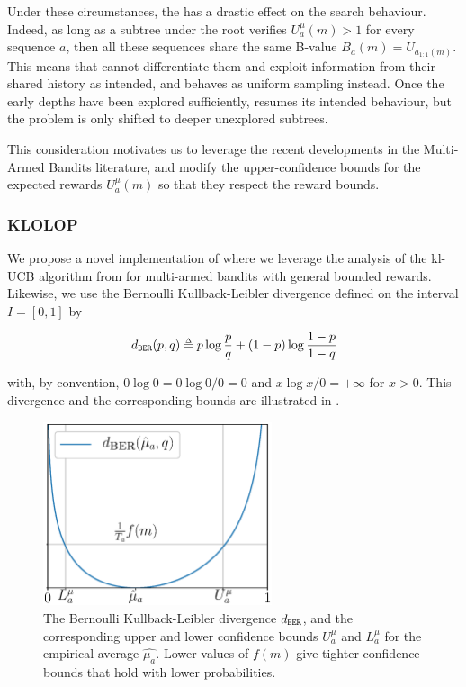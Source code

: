 Under these circumstances, the  has a drastic effect on the search behaviour. Indeed, as long as a subtree under the root verifies $U^{\mu}_a(m) > 1$ for every sequence $a$, then all these sequences share the same B-value $B_a(m) = U_{a_{1:1}(m)}$. This means that \OLOP cannot differentiate them and exploit information from their shared history as intended, and behaves as uniform sampling instead.
Once the early depths have been explored sufficiently, \OLOP resumes its intended behaviour, but the problem is only shifted to deeper unexplored subtrees.

This consideration motivates us to leverage the recent developments in the Multi-Armed Bandits literature, and modify the upper-confidence bounds for the expected rewards $U^\mu_a(m)$ so that they respect the reward bounds.


\subsubsection{\gls*{KLOLOP}}
\label{sec:kl-olop-kl-olop}

\noindent
We propose a novel implementation of  where we leverage the analysis of the kl-UCB algorithm from \citep{Cappe2013} for multi-armed bandits with general bounded rewards.
Likewise, we use the Bernoulli Kullback-Leibler divergence defined on the interval $I=[0,1]$ by

\begin{equation*}
\dber(p, q) \eqdef p \log \frac{p}{q} + (1-p)\log\frac{1-p}{1-q}
\end{equation*}

\noindent
with, by convention, $0 \log 0 = 0 \log 0/0 = 0$ and $x \log x /0 = +\infty$ for $x>0$.
This divergence and the corresponding bounds are illustrated in .

\begin{figure}[tp]
	\centering
	\includegraphics[width=0.6\textwidth]{img/ukl}
	\caption{The Bernoulli Kullback-Leibler divergence $d_\texttt{BER}$, and the corresponding upper and lower confidence bounds $U^{\mu}_a$ and $L^{\mu}_a$ for the empirical average $\hat{\mu_a}$. Lower values of $f(m)$ give tighter confidence bounds that hold with lower probabilities.}
	\label{fig:ukl}
\end{figure}

